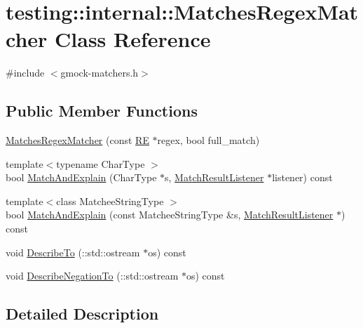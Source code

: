 \hypertarget{classtesting_1_1internal_1_1_matches_regex_matcher}{}\section{testing\+:\+:internal\+:\+:Matches\+Regex\+Matcher Class Reference}
\label{classtesting_1_1internal_1_1_matches_regex_matcher}


{\ttfamily \#include $<$gmock-\/matchers.\+h$>$}

\subsection*{Public Member Functions}
\begin{DoxyCompactItemize}
\item 
\hyperlink{classtesting_1_1internal_1_1_matches_regex_matcher_acce0beb9c72166b1c5771869cfebedd1}{Matches\+Regex\+Matcher} (const \hyperlink{classtesting_1_1internal_1_1_r_e}{RE} $\ast$regex, bool full\+\_\+match)
\item 
{\footnotesize template$<$typename Char\+Type $>$ }\\bool \hyperlink{classtesting_1_1internal_1_1_matches_regex_matcher_a27a5146509e08a8d248cd7967bac7d41}{Match\+And\+Explain} (Char\+Type $\ast$s, \hyperlink{classtesting_1_1_match_result_listener}{Match\+Result\+Listener} $\ast$listener) const 
\item 
{\footnotesize template$<$class Matchee\+String\+Type $>$ }\\bool \hyperlink{classtesting_1_1internal_1_1_matches_regex_matcher_ad7796e8be6b651f8bdae704df7cc4f08}{Match\+And\+Explain} (const Matchee\+String\+Type \&s, \hyperlink{classtesting_1_1_match_result_listener}{Match\+Result\+Listener} $\ast$) const 
\item 
void \hyperlink{classtesting_1_1internal_1_1_matches_regex_matcher_ab95aa201f56b0d6d0300ac513b011759}{Describe\+To} (\+::std\+::ostream $\ast$os) const 
\item 
void \hyperlink{classtesting_1_1internal_1_1_matches_regex_matcher_a3ed6b04a2ee7099c8f987c4a3a3ddfc5}{Describe\+Negation\+To} (\+::std\+::ostream $\ast$os) const 
\end{DoxyCompactItemize}


\subsection{Detailed Description}


